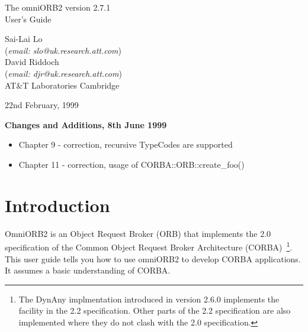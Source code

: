 \documentclass[11pt,twoside,onecolumn]{book}
\begin{document}
\pagestyle{empty}


\begin{center}

\vfill

{ \Huge
The omniORB2 version 2.7.1\\[4mm]
User's Guide
}

\vfill

{ \Large
Sai-Lai Lo\\
{\normalsize ({\it email: slo@uk.research.att.com})}\\
David Riddoch\\
{\normalsize ({\it email: djr@uk.research.att.com})}\\
AT\&T Laboratories Cambridge\\
}


\vfill
\vfill
22nd February, 1999
\vfill

\end{center}

\pagebreak

{\Large \bf \sf Changes and Additions, 8th June 1999}

\begin{itemize}
\item Chapter 9 - correction, recursive TypeCodes are supported
\item Chapter 11 - correction, usage of CORBA::ORB::create\_foo()
\end{itemize}


\cleardoublepage
\tableofcontents
\cleardoublepage
\pagestyle{headings}


\mainmatter

%
\chapter{Introduction}

OmniORB2 is an Object Request Broker (ORB) that implements the 2.0
specification of the Common Object Request Broker Architecture
(CORBA)~\cite{corba2-spec}\footnote{The DynAny implmentation introduced in
version 2.6.0 implements the facility in the 2.2 specification. Other parts
of the 2.2 specification are also implemented where they do not clash
with the 2.0 specification.}.
This user guide tells you how to use omniORB2 to develop CORBA applications.
It assumes a basic understanding of CORBA. 
\end{document}
